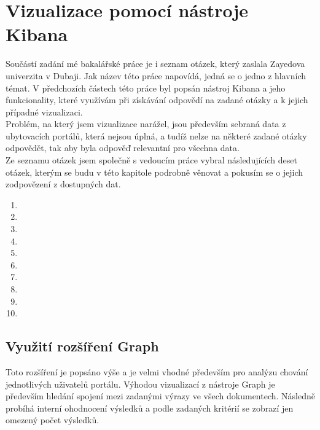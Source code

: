 \documentclass[czech,BP]{thesiskiv}
\begin{document}
\chapter{Vizualizace pomocí nástroje Kibana}
\label{Vizualizace}
Součástí zadání mé bakalářské práce je i seznam otázek, který zaslala Zayedova univerzita v Dubaji. Jak název této práce napovídá, jedná se o jedno z hlavních témat. V předchozích částech této práce byl popsán nástroj Kibana a jeho funkcionality, které využívám při získávání odpovědí na zadané otázky a k jejich případné vizualizaci.
\\
Problém, na který jsem vizualizace narážel, jsou především sebraná data z ubytovacích portálů, která nejsou úplná, a tudíž nelze na některé zadané otázky odpovědět, tak aby byla odpověď relevantní pro všechna data.
\\
Ze seznamu otázek jsem společně s vedoucím práce vybral následujících deset otázek, kterým se budu v této kapitole podrobně věnovat a pokusím se o jejich zodpovězení z dostupných dat.
\begin{enumerate}
	\item {}
	\item {}
	\item {}
	\item {}
	\item {}
	\item {}
	\item {}
	\item {}
	\item {}
	\item {}
\end{enumerate}
\newpage
\section{Využití rozšíření Graph}
Toto rozšíření je popsáno výše a je velmi vhodné především pro analýzu chování jednotlivých uživatelů portálu. Výhodou vizualizací z nástroje Graph je především hledání spojení mezi zadanými výrazy ve všech dokumentech. Následně probíhá interní ohodnocení výsledků a podle zadaných kritérií se zobrazí jen omezený počet výsledků.
\end{document}
